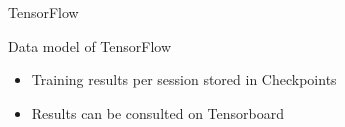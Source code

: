 \begin{frame}{TensorFlow}

\end{frame}

\begin{frame}{Data model of TensorFlow}
    \begin{itemize}
        \item Training results per session stored in Checkpoints
        \item Results can be consulted on Tensorboard
    \end{itemize}
\end{frame}

